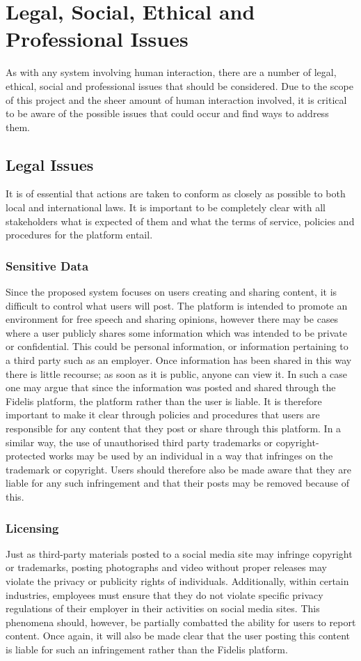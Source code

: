 \chapter{Legal, Social, Ethical and Professional Issues}
\label{Chapter:Issues}
As with any system involving human interaction, there are a number of legal, ethical, social and professional issues that should be considered. Due to the scope of this project and the sheer amount of human interaction involved, it is critical to be aware of the possible issues that could occur and find ways to address them.

\section{Legal Issues}
It is of essential that actions are taken to conform as closely as possible to both local and international laws. It is important to be completely clear with all stakeholders what is expected of them and what the terms of service, policies and procedures for the platform entail.

\subsection{Sensitive Data}
Since the proposed system focuses on users creating and sharing content, it is difficult to control what users will post. The platform is intended to promote an environment for free speech and sharing opinions, however there may be cases where a user publicly shares some information which was intended to be private or confidential. This could be personal information, or information pertaining to a third party such as an employer. Once information has been shared in this way there is little recourse; as soon as it is public, anyone can view it. In such a case one may argue that since the information was posted and shared through the Fidelis platform, the platform rather than the user is liable. It is therefore important to make it clear through policies and procedures that users are responsible for any content that they post or share through this platform. In a similar way, the use of unauthorised third party trademarks or copyright-protected works may be used by an individual in a way that infringes on the trademark or copyright. Users should therefore also be made aware that they are liable for any such infringement and that their posts may be removed because of this.

\subsection{Licensing}
Just as third-party materials posted to a social media site may infringe copyright or trademarks, posting photographs and video without proper releases may violate the privacy or publicity rights of individuals. Additionally, within certain industries, employees must ensure that they do not violate specific privacy regulations of their employer in their activities on social media sites. This phenomena should, however, be partially combatted the ability for users to report content. Once again, it will also be made clear that the user posting this content is liable for such an infringement rather than the Fidelis platform.

